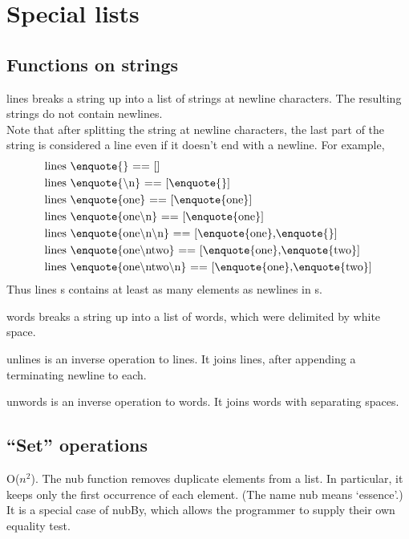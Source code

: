 \section{Special lists}
\subsection{Functions on strings}
lines breaks a string up into a list of strings at newline characters. The resulting strings do not contain newlines.\\
Note that after splitting the string at newline characters, the last part of the string is considered a line even if it doesn't end with a newline. For example,
\begin{align*}
	&\text{lines \enquote{} == []}\\
	&\text{lines \enquote{\textbackslash n} == [\enquote{}]}\\
	&\text{lines \enquote{one} == [\enquote{one}]}\\
	&\text{lines \enquote{one\textbackslash n} == [\enquote{one}]}\\
	&\text{lines \enquote{one\textbackslash n\textbackslash n} == [\enquote{one},\enquote{}]}\\
	&\text{lines \enquote{one\textbackslash ntwo} == [\enquote{one},\enquote{two}]}\\
	&\text{lines \enquote{one\textbackslash ntwo\textbackslash n} == [\enquote{one},\enquote{two}]}
\end{align*}
Thus lines s contains at least as many elements as newlines in s.

words breaks a string up into a list of words, which were delimited by white space.

unlines is an inverse operation to lines. It joins lines, after appending a terminating newline to each.

unwords is an inverse operation to words. It joins words with separating spaces.

\subsection{\enquote{Set} operations}
O($n^2$). The nub function removes duplicate elements from a list. In particular, it keeps only the first occurrence of each element. (The name nub means `essence'.) It is a special case of nubBy, which allows the programmer to supply their own equality test.

